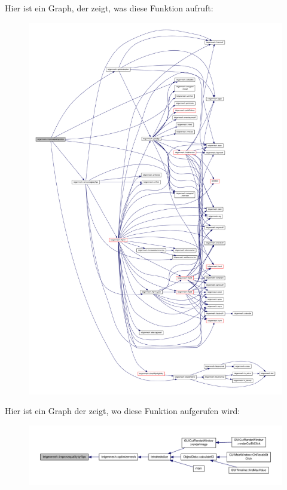 Hier ist ein Graph, der zeigt, was diese Funktion aufruft\-:
\nopagebreak
\begin{figure}[H]
\begin{center}
\leavevmode
\includegraphics[width=350pt]{classtetgenmesh_a3d724f195ed9c3f5e1378d1f4f0c5282_cgraph}
\end{center}
\end{figure}




Hier ist ein Graph der zeigt, wo diese Funktion aufgerufen wird\-:
\nopagebreak
\begin{figure}[H]
\begin{center}
\leavevmode
\includegraphics[width=350pt]{classtetgenmesh_a3d724f195ed9c3f5e1378d1f4f0c5282_icgraph}
\end{center}
\end{figure}



